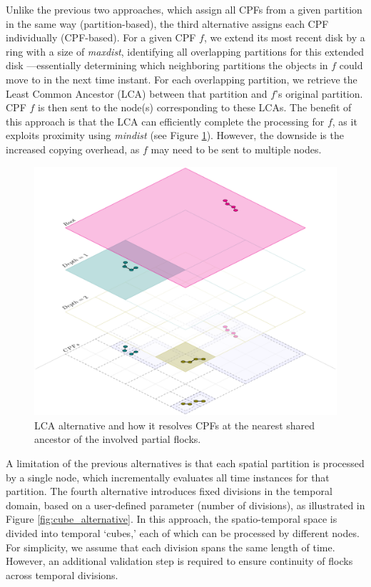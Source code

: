 Unlike the previous two approaches, which assign all CPFs from a given partition in the same way (partition-based), the third alternative assigns each CPF individually (CPF-based). For a given CPF $f$, we extend its most recent disk by a ring with a size of \textit{maxdist}, identifying all overlapping partitions for this extended disk —essentially determining which neighboring partitions the objects in $f$ could move to in the next time instant. For each overlapping partition, we retrieve the Least Common Ancestor (LCA) between that partition and $f$'s original partition. CPF $f$ is then sent to the node(s) corresponding to these LCAs. The benefit of this approach is that the LCA can efficiently complete the processing for $f$, as it exploits proximity using \textit{mindist} (see Figure \ref{fig:lca_alternative}).  However, the downside is the increased copying overhead, as $f$ may need to be sent to multiple nodes.

\begin{figure}
    \centering
    \includegraphics[width=0.75\linewidth]
    {chapterPFlocks/figures/plots/11_temporal_partitions/LCA}
    \caption{LCA alternative and how it resolves CPFs at the nearest shared ancestor of the involved partial flocks.}\label{fig:lca_alternative}
\end{figure}

A limitation of the previous alternatives is that each spatial partition is processed by a single node, which incrementally evaluates all time instances for that partition. The fourth alternative introduces fixed divisions in the temporal domain, based on a user-defined parameter (number of divisions), as illustrated in Figure \ref{fig:cube_alternative}. In this approach, the spatio-temporal space is divided into temporal `cubes,' each of which can be processed by different nodes. For simplicity, we assume that each division spans the same length of time. However, an additional validation step is required to ensure continuity of flocks across temporal divisions.

